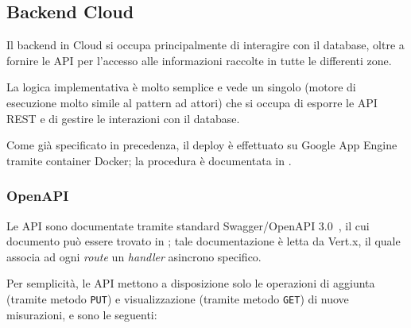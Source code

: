 \subsection{Backend Cloud}\label{subsec:cloud}

Il backend in Cloud si occupa principalmente di interagire con il database, oltre a fornire le API per l'accesso alle informazioni raccolte in tutte le differenti zone.

La logica implementativa è molto semplice e vede un singolo  (motore di esecuzione molto simile al pattern ad attori) che si occupa di esporre le API REST e di gestire le interazioni con il database.

Come già specificato in precedenza, il deploy è effettuato su Google App Engine tramite container Docker;
la procedura è documentata in .

\subsubsection{OpenAPI}

Le API sono documentate tramite standard Swagger/OpenAPI 3.0~\cite{OpenAPIInitiative2018}, il cui documento può essere trovato in ;
tale documentazione è letta da Vert.x, il quale associa ad ogni \emph{route} un \emph{handler} asincrono specifico.

Per semplicità, le API mettono a disposizione solo le operazioni di aggiunta (tramite metodo \texttt{PUT}) e visualizzazione (tramite metodo \texttt{GET}) di nuove misurazioni, e sono le seguenti:

